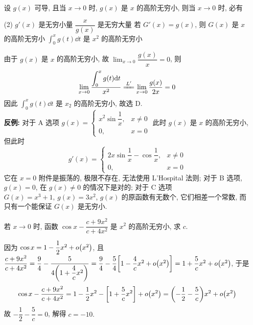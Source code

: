 \begin{example}
    设 $g(x)$ 可导, 且当 $x\to0$ 时,  $g(x)$ 是 $x$ 的高阶无穷小, 则当 $x\to0$  时, 必有
    \begin{tasks}(2)
        \task $g'(x)$ 是无穷小量
        \task $\dfrac{x}{g(x)}$ 是无穷大量
        \task 若 $G'(x)=g(x)$, 则 $G(x)$ 是 $x$ 的高阶无穷小
        \task $\displaystyle\int_{0}^{x}g(t)\dd t$ 是 $x^2$ 的高阶无穷小
    \end{tasks}
\end{example}
\begin{solution}
    由于 $g(x)$ 是 $x$ 的高阶无穷小, 故 $\displaystyle\lim_{x\to0}\dfrac{g(x)}{x}=0$, 则 $$\displaystyle\lim_{x\to0}\dfrac{\displaystyle\int_{0}^{x}g(t)\dd t}{x^2} \xlongequal{L'}\lim_{x\to0}\dfrac{g(x)}{2x}=0$$
    因此 $\displaystyle\int_{0}^{x}g(t)\dd t$ 是 $x_2$ 的高阶无穷小, 故选 D.\\
    \textbf{反例: }对于 A 选项 $g(x)=\begin{cases}
            x^2\sin\dfrac{1}{x}, & x\neq0 \\
            0,                   & x=0
        \end{cases}$ 此时 $g(x)$ 是 $x$ 的高阶无穷小, 但此时 $$g'(x)=\begin{cases}
            2x\sin\dfrac{1}{x}-\cos\dfrac{1}{x}, & x\neq0 \\
            0,                                   & x=0
        \end{cases}$$
    它在 $x=0$ 附件是振荡的, 极限不存在, 无法使用 L'Hospital 法则; 对于 B 选项, $g(x)=0$, 在 $g(x)\neq0$ 的情况下是对的; 对于 C 选项 $G(x)=x^3+1,~g(x)=3x^2$, $g(x)$ 的原函数有无数个, 它们相差一个常数, 而只有一个能保证 $G(x)$ 是无穷小.
\end{solution}

\begin{example}
    若 $x\to0$ 时, 函数 $\cos x-\dfrac{c+9x^2}{c+4x^2}$ 是 $x^2$ 的高阶无穷小, 求 $c$.
\end{example}
\begin{solution}
    因为 $\cos x=1-\dfrac{1}{2}x^2+o\qty(x^2)$, 且 $\dfrac{c+9x^2}{c+4x^2}=\dfrac{9}{4}-\dfrac{5}{4\qty(1+\dfrac{4}{c}x^2)}=\dfrac{9}{4}-\dfrac{5}{4}\qty[1-\dfrac{4}{c}x^2+o\qty(x^2)]=1+\dfrac{5}{c}x^2+o\qty(x^2)$, 于是
    $$\cos x-\dfrac{c+9x^2}{c+4x^2}=1-\dfrac{1}{2}x^2-\qty[1+\dfrac{5}{c}x^2]+o\qty(x^2)=\qty(-\dfrac{1}{2}-\dfrac{5}{c})x^2+o\qty(x^2)$$
    故 $-\dfrac{1}{2}-\dfrac{5}{c}=0$, 解得 $c=-10.$
\end{solution}

